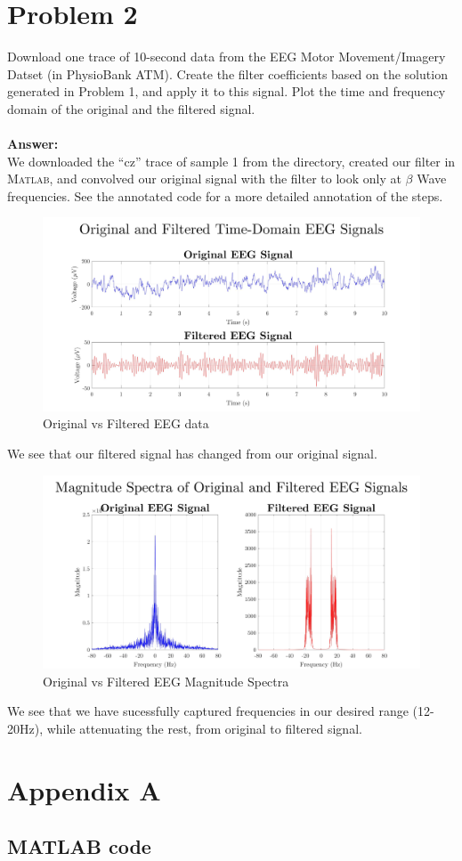 \documentclass[12pt, a4paper]{article}
\begin{document}
\section*{Problem 2}
Download one trace of 10-second data from the EEG Motor Movement/Imagery Datset (in PhysioBank ATM). Create the filter coefficients based on the solution generated in Problem 1, and apply it to this signal. Plot the time and frequency domain of the original and the filtered signal. \\ \\
\textbf{Answer: } \\ 
We downloaded the ``cz'' trace of sample 1 from the directory, created our filter in \textsc{Matlab}, and convolved our original signal with the filter to look only at $\beta$ Wave frequencies. See the annotated code for a more detailed annotation of the steps.
\begin{figure}[H]
\centering
\includegraphics[width=\textwidth]{time}
\caption{Original vs Filtered EEG data}
\end{figure}
\noindent We see that our filtered signal has changed from our original signal.
\begin{figure}[H]
\centering
\includegraphics[width=\textwidth]{mag}
\caption{Original vs Filtered EEG Magnitude Spectra}
\end{figure}
\noindent We see that we have sucessfully captured frequencies in our desired range (12-20Hz), while attenuating the rest, from original to filtered signal.

\pagebreak
\section*{\fontsize{19}{15}\selectfont Appendix A}
\subsection*{MATLAB code}

\end{document}
